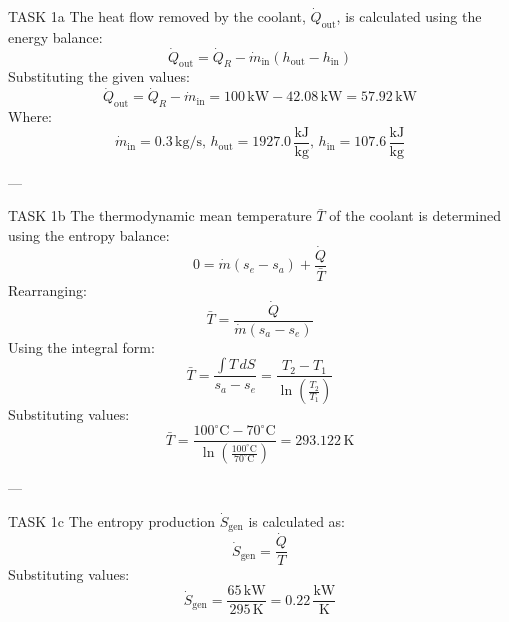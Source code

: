 TASK 1a  
The heat flow removed by the coolant, \( \dot{Q}_{\text{out}} \), is calculated using the energy balance:  
\[
\dot{Q}_{\text{out}} = \dot{Q}_R - \dot{m}_{\text{in}} (h_{\text{out}} - h_{\text{in}})
\]  
Substituting the given values:  
\[
\dot{Q}_{\text{out}} = \dot{Q}_R - \dot{m}_{\text{in}} = 100 \, \text{kW} - 42.08 \, \text{kW} = 57.92 \, \text{kW}
\]  
Where:  
\[
\dot{m}_{\text{in}} = 0.3 \, \text{kg/s}, \, h_{\text{out}} = 1927.0 \, \frac{\text{kJ}}{\text{kg}}, \, h_{\text{in}} = 107.6 \, \frac{\text{kJ}}{\text{kg}}
\]  

---

TASK 1b  
The thermodynamic mean temperature \( \bar{T} \) of the coolant is determined using the entropy balance:  
\[
0 = \dot{m} (s_e - s_a) + \frac{\dot{Q}}{\bar{T}}
\]  
Rearranging:  
\[
\bar{T} = \frac{\dot{Q}}{\dot{m} (s_a - s_e)}
\]  
Using the integral form:  
\[
\bar{T} = \frac{\int T \, dS}{s_a - s_e} = \frac{T_2 - T_1}{\ln \left( \frac{T_2}{T_1} \right)}
\]  
Substituting values:  
\[
\bar{T} = \frac{100^\circ\text{C} - 70^\circ\text{C}}{\ln \left( \frac{100^\circ\text{C}}{70^\circ\text{C}} \right)} = 293.122 \, \text{K}
\]  

---

TASK 1c  
The entropy production \( \dot{S}_{\text{gen}} \) is calculated as:  
\[
\dot{S}_{\text{gen}} = \frac{\dot{Q}}{T}
\]  
Substituting values:  
\[
\dot{S}_{\text{gen}} = \frac{65 \, \text{kW}}{295 \, \text{K}} = 0.22 \, \frac{\text{kW}}{\text{K}}
\]  